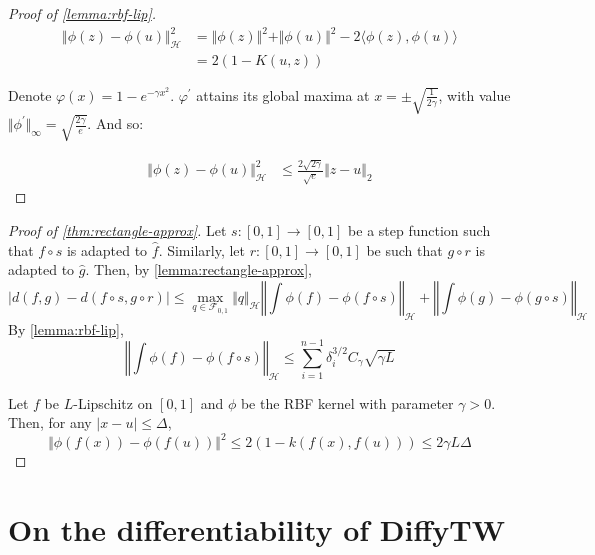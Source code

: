 \begin{proof}[Proof of \cref{lemma:rbf-lip}]

\begin{align}
\Vert \phi(z) - \phi(u)\Vert_\mathcal H^2 &= \Vert \phi(z) \Vert^2+ \Vert \phi(u)\Vert^2 - 2 \langle \phi(z), \phi(u)\rangle\\
&= 2 \left(1 - K(u, z)\right)
\end{align}

Denote $\varphi(x) = 1- e^{-\gamma x^2}$. $\varphi^\prime$ attains its global maxima at $x = \pm \sqrt{\frac{1}{2\gamma}}$, with value $\Vert \phi^\prime\Vert_{\infty} = \sqrt{\frac{2\gamma}{e}}$. And so:

\begin{align}
\Vert \phi(z) - \phi(u)\Vert_\mathcal H^2 & \leq \frac{2\sqrt{2\gamma}}{\sqrt{e}}\Vert z - u \Vert_2
\end{align}
\end{proof}

\begin{proof}[Proof of \cref{thm:rectangle-approx}]
Let $s:[0,1] \to [0,1]$ be a step function such that $f\circ s$ is adapted to $\hat f$. Similarly, let $r:[0,1]\to[0,1]$ be such that $g\circ r$ is adapted to $\hat g$. Then, by \cref{lemma:rectangle-approx},
\begin{equation}
    \vert d(f, g) - d(f \circ s, g\circ r) \vert \leq \max_{q\in\mathcal F_{0,1}}\Vert q \Vert_\mathcal H \left\Vert \int \phi(f) - \phi(f\circ s)\right\Vert_{\mathcal H} + \left\Vert \int \phi(g)- \phi(g\circ s)\right\Vert_\mathcal H
\end{equation}
By \cref{lemma:rbf-lip},
\begin{equation}
\left\Vert \int \phi(f) - \phi(f\circ s)\right\Vert_{\mathcal H} \leq \sum_{i=1}^{n-1} \delta_i^{3/2}C_\gamma\sqrt{\gamma L}
\end{equation}





Let $f$ be $L$-Lipschitz on $[0,1]$ and $\phi$ be the RBF kernel with parameter $\gamma > 0$.
Then, for any $\vert x - u \vert \leq \Delta$,
\begin{equation}
    \Vert \phi(f(x)) - \phi(f(u)) \Vert^2 \leq 2\left(1 - k(f(x), f(u))\right) \leq 2 \gamma L \Delta
\end{equation}
\end{proof}

\section{On the differentiability of DiffyTW}

